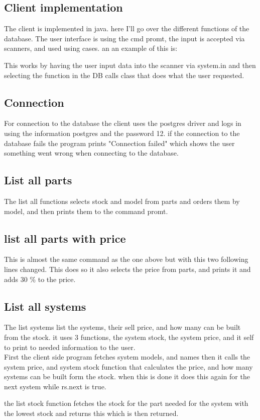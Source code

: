 \documentclass[a4paper,10pt,titlepage]{report}
\begin{document}
\subsection{Client implementation}
The client is implemented in java. here I'll go over the different functions of the database.
The user interface is using the cmd promt, the input is accepted via scanners, and used using cases. an an example of this is:

This works by having the user input data into the scanner via system.in and then selecting the function in the DB calls class that does what the user requested.
\subsection{Connection}
For connection to the database the client uses the postgres driver and logs in using the information postgres and the password 12. if the connection to the database fails the program prints "Connection failed" which shows the user something went wrong when connecting to the database.

\subsection{List all parts}
The list all functions selects stock and model from parts and orders them by model, and then prints them to the command promt.

\subsection{list all parts with price}
This is almost the same command as the one above but with this two following lines changed.
This does so it also selects the price from parts, and prints it and adds 30 \% to the price.	

\subsection{List all systems}
The list systems list the systems, their sell price, and how many can be built from the stock. it uses 3 functions, the system stock, the system price, and it self to print to needed information to the user.
\\ \vspace{5 mm}
First the client side program fetches system models, and names then it calls the system price, and system stock function that calculates the price, and how many systems can be built form the stock. when this is done it does this again for the next system while rs.next is true.

the list stock function fetches the stock for the part needed for the system with the lowest stock and returns this which is then returned.
\end{document}
